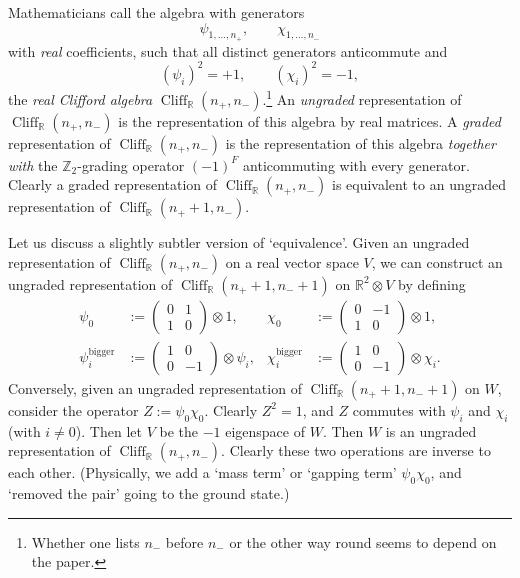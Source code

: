 \documentclass[12pt]{article}
\numberwithin{equation}{section}
\numberwithin{figure}{section}
\theoremstyle{remark}
\def\bR{\mathbb{R}}
\def\bZ{\mathbb{Z}}
\def\Cliff{\mathop{\mathrm{Cliff}}\nolimits}
\begin{document}
Mathematicians call the algebra with generators \begin{equation}
\psi_{1,\ldots,n_+}, \qquad \chi_{1,\ldots,n_-}
\end{equation} with \emph{real} coefficients,
such that all distinct generators anticommute and \begin{equation}
(\psi_i)^2=+1, \qquad (\chi_i)^2=-1,
\end{equation} the \emph{real Clifford algebra} $\Cliff_\bR(n_+,n_-)$.\footnote{%
Whether one lists $n_-$ before $n_-$ or the other way round seems to depend on the paper.
}
An \emph{ungraded} representation of $\Cliff_\bR(n_+,n_-)$ is the representation of this algebra
by real matrices.
A \emph{graded} representation of $\Cliff_\bR(n_+,n_-)$ is the representation of this algebra
\emph{together with} the $\bZ_2$-grading operator $(-1)^F$ anticommuting with 
every generator.
Clearly a graded representation of $\Cliff_\bR(n_+,n_-)$ is equivalent to an ungraded representation of $\Cliff_\bR(n_++1,n_-)$.

Let us discuss a slightly subtler version of `equivalence'. 
Given an ungraded representation of $\Cliff_\bR(n_+,n_-)$ on a real vector space $V$,
we can construct an ungraded representation of $\Cliff_\bR(n_++1,n_-+1)$ on $\bR^2\otimes V$
by defining \begin{equation}
\begin{aligned}
\psi_0&:=\begin{pmatrix}
0 & 1\\
1& 0
\end{pmatrix} \otimes 1,&
\chi_0&:=\begin{pmatrix}
0 & -1\\
1& 0
\end{pmatrix} \otimes 1,\\
\psi_i^\text{bigger}& :=\begin{pmatrix}
1 & 0\\
0 & -1
\end{pmatrix} \otimes \psi_i,&
\chi_i^\text{bigger}& :=\begin{pmatrix}
1 & 0\\
0 & -1
\end{pmatrix} \otimes \chi_i.
\end{aligned}
\end{equation}
Conversely, given an ungraded representation of 
$\Cliff_\bR(n_++1,n_-+1)$ on $W$,
consider the operator $Z:=\psi_0 \chi_0$. Clearly $Z^2=1$, and $Z$ commutes with $\psi_i$ and $\chi_i$ (with $i\neq 0$).
Then let $V$ be the $-1$ eigenspace of $W$.
Then $W$ is an ungraded representation of $\Cliff_\bR(n_+,n_-)$.
Clearly these two operations are inverse to each other.
(Physically, we add a `mass term' or `gapping term' $\psi_0 \chi_0$, 
and `removed the pair' going to the ground state.)
\end{document}
